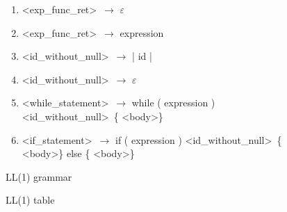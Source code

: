 \documentclass[a4paper, 11pt]{article}
\begin{document}
\begin{figure}[ht]
\begin{center}
\begin{enumerate}
        \item \textless exp\_func\_ret\textgreater\ $\to$ $\varepsilon$
        \item \textless exp\_func\_ret\textgreater\ $\to$ expression
        \item \textless id\_without\_null\textgreater\ $\to$ | id |
        \item \textless id\_without\_null\textgreater\ $\to$ $\varepsilon$
        \item \textless while\_statement\textgreater\ $\to$ while ( expression ) \textless id\_without\_null\textgreater\ \{ \textless body\textgreater \}
        \item \textless if\_statement\textgreater\ $\to$ if ( expression ) \textless id\_without\_null\textgreater\ \{ \textless body\textgreater \} else \{ \textless body\textgreater \}
    \end{enumerate}
    \caption{LL(1) grammar}
    \label{ll1rules}
\end{center}
\end{figure}

\begin{figure}[ht]
    \begin{center}
        \caption{LL(1) table}
        \label{ll1table}
    \end{center}
\end{figure}
\end{document}

